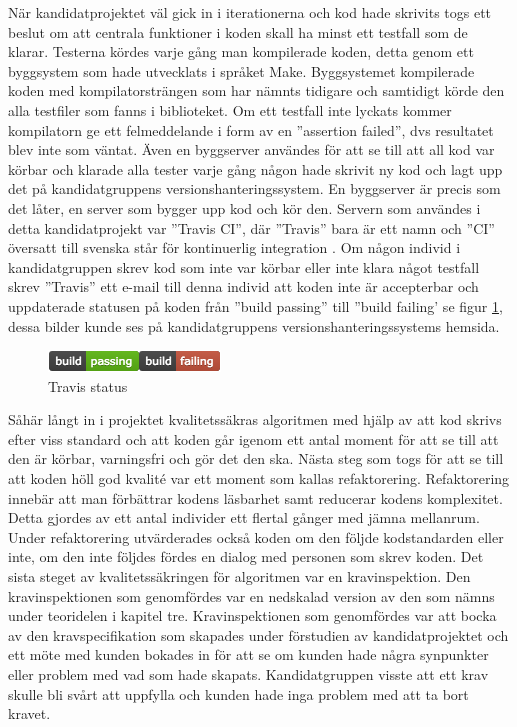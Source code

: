 När kandidatprojektet väl gick in i iterationerna och kod hade skrivits togs ett beslut om att centrala funktioner i koden skall ha minst ett testfall som de klarar. Testerna kördes varje gång man kompilerade koden, detta genom ett byggsystem som hade utvecklats i språket Make. Byggsystemet kompilerade koden med kompilatorsträngen som har nämnts tidigare och samtidigt körde den alla testfiler som fanns i biblioteket. Om ett testfall inte lyckats kommer kompilatorn ge ett felmeddelande i form av en ''assertion failed'', dvs resultatet blev inte som väntat. Även en byggserver användes för att se till att all kod var körbar och klarade alla tester varje gång någon hade skrivit ny kod och lagt upp det på kandidatgruppens versionshanteringssystem. En  byggserver är precis som det låter, en server som bygger upp kod och kör den. Servern som användes i detta kandidatprojekt var ''Travis CI'', där ''Travis'' bara är ett namn och ''CI'' översatt till svenska står för kontinuerlig integration \citep{travisinfo}. Om någon individ i kandidatgruppen skrev kod som inte var körbar eller inte klara något testfall skrev ''Travis'' ett e-mail till denna individ att koden inte är accepterbar och uppdaterade statusen på koden från ''build passing'' till ''build failing' se figur \ref{fig:travisstatus}, dessa bilder kunde ses på kandidatgruppens versionshanteringssystems hemsida.
\begin{figure}[h]
\centerline{\includegraphics[scale=0.8]{ruben-tex/graphic/travisstatus}}
\caption{Travis status}
\label{fig:travisstatus}
\end{figure}
\newline
Såhär långt in i projektet kvalitetssäkras algoritmen med hjälp av att kod skrivs efter viss standard och att koden går igenom ett antal moment för att se till att den är körbar, varningsfri och gör det den ska. Nästa steg som togs för att se till att koden höll god kvalité var ett moment som kallas refaktorering. Refaktorering innebär att man förbättrar kodens läsbarhet samt reducerar kodens komplexitet. Detta gjordes av ett antal individer ett flertal gånger med jämna mellanrum. Under refaktorering utvärderades också koden om den följde kodstandarden eller inte, om den inte följdes fördes en dialog med personen som skrev koden.
\newline
\newline
Det sista steget av kvalitetssäkringen för algoritmen var en kravinspektion. Den kravinspektionen som genomfördes var en nedskalad version av den som nämns under teoridelen i kapitel tre. Kravinspektionen som genomfördes var att bocka av den kravspecifikation som skapades under förstudien av kandidatprojektet och ett möte med kunden bokades in för att se om kunden hade några synpunkter eller problem med vad som hade skapats. Kandidatgruppen visste att ett krav skulle bli svårt att uppfylla och kunden hade inga problem med att ta bort kravet.
